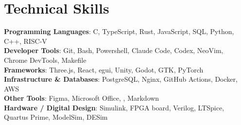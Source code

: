 
\section{Technical Skills}
\begin{itemize}[leftmargin=0in, label={}]
  \small{\item{
        \textbf{Programming Languages}{: C, TypeScript, Rust, JavaScript, SQL, Python, C++, RISC-V} \\
        \textbf{Developer Tools}{: Git, Bash, Powershell, Claude Code, Codex, NeoVim, Chrome DevTools, Makefile} \\
        \textbf{Frameworks}{: Three.js, React, egui, Unity, Godot, GTK, PyTorch} \\
        \textbf{Infrastructure \& Databases}{: PostgreSQL, Nginx, GitHub Actions, Docker, AWS} \\
        \textbf{Other Tools}{: Figma, Microsoft Office, , Markdown} \\
        \textbf{Hardware / Digital Design}{: Simulink, FPGA board, Verilog, LTSpice, Quartus Prime, ModelSim, DESim}
        }}
\end{itemize}

